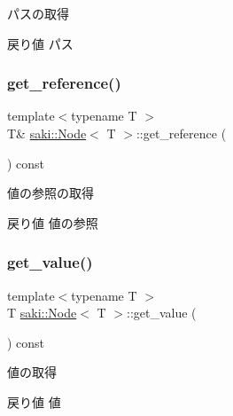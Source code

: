 パスの取得 

\begin{DoxyReturn}{戻り値}
パス 
\end{DoxyReturn}
\mbox{\label{classsaki_1_1_node_a91d632d4db82e0415f394b14c5f6ce58}} 
\subsubsection{\texorpdfstring{get\+\_\+reference()}{get\_reference()}}
{\footnotesize\ttfamily template$<$typename T $>$ \\
T\& \mbox{\hyperlink{classsaki_1_1_node}{saki\+::\+Node}}$<$ T $>$\+::get\+\_\+reference (\begin{DoxyParamCaption}{ }\end{DoxyParamCaption}) const\hspace{0.3cm}{\ttfamily [inline]}}



値の参照の取得 

\begin{DoxyReturn}{戻り値}
値の参照 
\end{DoxyReturn}
\mbox{\label{classsaki_1_1_node_a9e88537adb4d8b79fe456f2496ed1bca}} 
\subsubsection{\texorpdfstring{get\+\_\+value()}{get\_value()}}
{\footnotesize\ttfamily template$<$typename T $>$ \\
T \mbox{\hyperlink{classsaki_1_1_node}{saki\+::\+Node}}$<$ T $>$\+::get\+\_\+value (\begin{DoxyParamCaption}{ }\end{DoxyParamCaption}) const\hspace{0.3cm}{\ttfamily [inline]}}



値の取得 

\begin{DoxyReturn}{戻り値}
値 
\end{DoxyReturn}
\mbox{\label{classsaki_1_1_node_ad6fc40d14da87ba8cb39e21bb8f16cdc}} 
